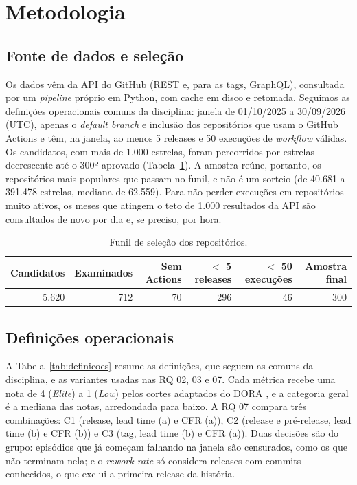 \section{Metodologia}

\subsection{Fonte de dados e seleção}

Os dados vêm da API do GitHub (REST e, para as tags, GraphQL), consultada por um \textit{pipeline} próprio em Python, com cache em disco e retomada. Seguimos as definições operacionais comuns da disciplina: janela de 01/10/2025 a 30/09/2026 (UTC), apenas o \textit{default branch} e inclusão dos repositórios que usam o GitHub Actions e têm, na janela, ao menos 5 releases e 50 execuções de \textit{workflow} válidas. Os candidatos, com mais de 1.000 estrelas, foram percorridos por estrelas decrescente até o 300º aprovado (Tabela~\ref{tab:funil}). A amostra reúne, portanto, os repositórios mais populares que passam no funil, e não é um sorteio (de 40.681 a 391.478 estrelas, mediana de 62.559). Para não perder execuções em repositórios muito ativos, os meses que atingem o teto de 1.000 resultados da API são consultados de novo por dia e, se preciso, por hora.

\begin{table}[ht]
\centering
\footnotesize
\caption{Funil de seleção dos repositórios.}
\label{tab:funil}
\begin{tabular}{rrrrrr}
\hline
Candidatos & Examinados & Sem Actions & $<$ 5 releases & $<$ 50 execuções & Amostra final \\
\hline
5.620 & 712 & 70 & 296 & 46 & 300 \\
\hline
\end{tabular}
\end{table}

\subsection{Definições operacionais}
\label{sec:definicoes}

A Tabela~\ref{tab:definicoes} resume as definições, que seguem as comuns da disciplina, e as variantes usadas nas RQ 02, 03 e 07. Cada métrica recebe uma nota de 4 (\textit{Elite}) a 1 (\textit{Low}) pelos cortes adaptados do DORA \cite{dora2024report}, e a categoria geral é a mediana das notas, arredondada para baixo. A RQ 07 compara três combinações: C1 (release, lead time (a) e CFR (a)), C2 (release e pré-release, lead time (b) e CFR (b)) e C3 (tag, lead time (b) e CFR (a)). Duas decisões são do grupo: episódios que já começam falhando na janela são censurados, como os que não terminam nela; e o \textit{rework rate} só considera releases com commits conhecidos, o que exclui a primeira release da história.


